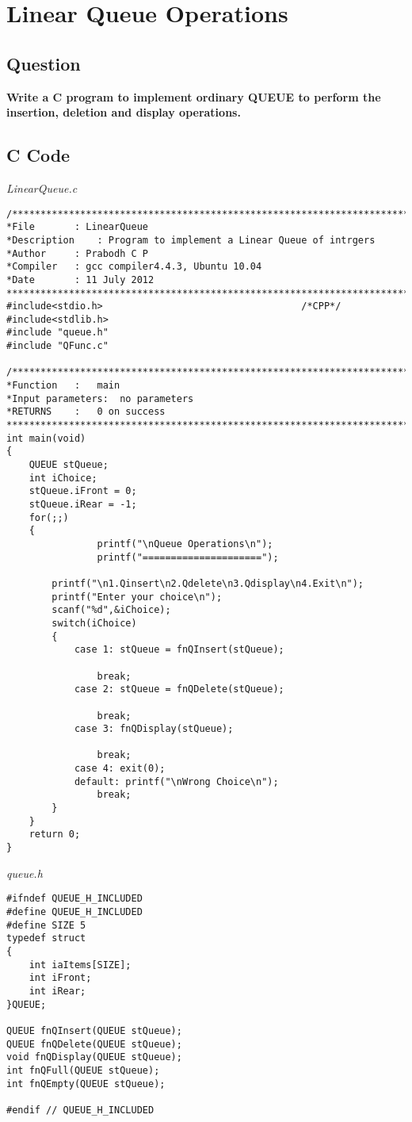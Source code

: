 \chapter{Linear Queue Operations}
\section*{Question}
{\selectfont \textbf{Write a C program to implement ordinary QUEUE to perform the insertion, deletion and display operations.
}}

\section*{C Code}
\textit{LinearQueue.c
}
\begin{Verbatim}
/***************************************************************************
*File		: LinearQueue
*Description	: Program to implement a Linear Queue of intrgers
*Author		: Prabodh C P
*Compiler	: gcc compiler4.4.3, Ubuntu 10.04
*Date		: 11 July 2012
***************************************************************************/
#include<stdio.h>									/*CPP*/
#include<stdlib.h>
#include "queue.h"
#include "QFunc.c"

/***************************************************************************
*Function	: 	main
*Input parameters:	no parameters
*RETURNS	:	0 on success
***************************************************************************/
int main(void)
{
    QUEUE stQueue;
	int iChoice;
	stQueue.iFront = 0;
	stQueue.iRear = -1;
	for(;;)
	{
                printf("\nQueue Operations\n");
                printf("=====================");

		printf("\n1.Qinsert\n2.Qdelete\n3.Qdisplay\n4.Exit\n");
		printf("Enter your choice\n");
		scanf("%d",&iChoice);
		switch(iChoice)
		{
			case 1: stQueue = fnQInsert(stQueue);

				break;
			case 2: stQueue = fnQDelete(stQueue);

				break;
			case 3: fnQDisplay(stQueue);

				break;
			case 4: exit(0);
			default: printf("\nWrong Choice\n");
				break;
		}
	}
	return 0;
}
\end{Verbatim}

\textit{queue.h
}
\begin{Verbatim}
#ifndef QUEUE_H_INCLUDED
#define QUEUE_H_INCLUDED
#define SIZE 5
typedef struct
{
	int iaItems[SIZE];
	int iFront;
	int iRear;
}QUEUE;

QUEUE fnQInsert(QUEUE stQueue);
QUEUE fnQDelete(QUEUE stQueue);
void fnQDisplay(QUEUE stQueue);
int fnQFull(QUEUE stQueue);
int fnQEmpty(QUEUE stQueue);

#endif // QUEUE_H_INCLUDED
\end{Verbatim}

